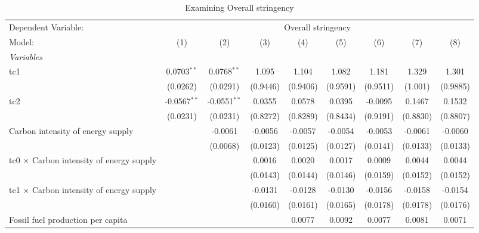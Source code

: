 
\begin{table}[htbp]
   \caption{Examining Overall stringency}
   \centering
   \begin{tabular}{lcccccccc}
      \tabularnewline \midrule \midrule
      Dependent Variable: & \multicolumn{8}{c}{Overall stringency}\\
      Model:                                          & (1)            & (2)            & (3)      & (4)      & (5)      & (6)      & (7)      & (8)\\  
      \midrule
      \emph{Variables}\\
      tc1                                             & 0.0703$^{**}$  & 0.0768$^{**}$  & 1.095    & 1.104    & 1.082    & 1.181    & 1.329    & 1.301\\   
                                                      & (0.0262)       & (0.0291)       & (0.9446) & (0.9406) & (0.9591) & (0.9511) & (1.001)  & (0.9885)\\   
      tc2                                             & -0.0567$^{**}$ & -0.0551$^{**}$ & 0.0355   & 0.0578   & 0.0395   & -0.0095  & 0.1467   & 0.1532\\   
                                                      & (0.0231)       & (0.0231)       & (0.8272) & (0.8289) & (0.8434) & (0.9191) & (0.8830) & (0.8807)\\   
      Carbon intensity of energy supply               &                & -0.0061        & -0.0056  & -0.0057  & -0.0054  & -0.0053  & -0.0061  & -0.0060\\   
                                                      &                & (0.0068)       & (0.0123) & (0.0125) & (0.0127) & (0.0141) & (0.0133) & (0.0133)\\   
      tc0 $\times$ Carbon intensity of energy supply  &                &                & 0.0016   & 0.0020   & 0.0017   & 0.0009   & 0.0044   & 0.0044\\   
                                                      &                &                & (0.0143) & (0.0144) & (0.0146) & (0.0159) & (0.0152) & (0.0152)\\   
      tc1 $\times$ Carbon intensity of energy supply  &                &                & -0.0131  & -0.0128  & -0.0130  & -0.0156  & -0.0158  & -0.0154\\   
                                                      &                &                & (0.0160) & (0.0161) & (0.0165) & (0.0178) & (0.0178) & (0.0176)\\   
      Fossil fuel production per capita               &                &                &          & 0.0077   & 0.0092   & 0.0077   & 0.0081   & 0.0071\\   

\end{tabular}
\end{table}

